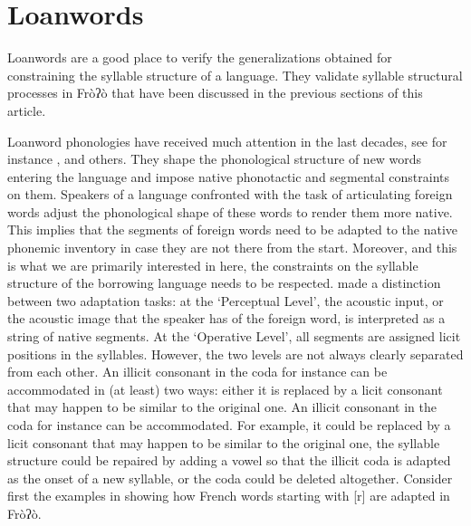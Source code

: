 \documentclass[output=paper]{langscibook}
\begin{document}
\section{Loanwords}
\label{sec:traore:loanwords:5}

 Loanwords are a good place to verify the generalizations obtained for constraining the syllable structure of a language. They validate syllable structural processes in Fròʔò that have been discussed in the previous sections of this article.

Loanword phonologies have received much attention in the last decades, see for instance \citet{Ito1995},  \citet{Peperkamp2003} and others. They shape the phonological structure of new words entering the language and impose native phonotactic and segmental constraints on them. Speakers of a language confronted with the task of articulating foreign words adjust the phonological shape of these words to render them more native. This implies that the segments of foreign words need to be adapted to the native phonemic inventory in case they are not there from the start. Moreover, and this is what we are primarily interested in here, the constraints on the syllable structure of the borrowing language needs to be respected. \citet{Silverman1992} made a distinction between two adaptation tasks: at the ‘Perceptual Level’, the acoustic input, or the acoustic image that the speaker has of the foreign word, is interpreted as a string of native segments. At the ‘Operative Level’, all segments are assigned licit positions in the syllables. However, the two levels are not always clearly separated from each other. An illicit consonant in the coda for instance can be accommodated in (at least) two ways: either it is replaced by a licit consonant that may happen to be similar to the original one. An illicit consonant in the coda for instance can be accommodated. For example, it could be replaced by a licit consonant that may happen
to be similar to the original one, the syllable structure could be repaired by adding a vowel so that the illicit coda is adapted as the onset of a
new syllable, or the coda could be deleted altogether. Consider first the examples in  showing how French words starting with [r] are adapted in Fròʔò.
\end{document}

